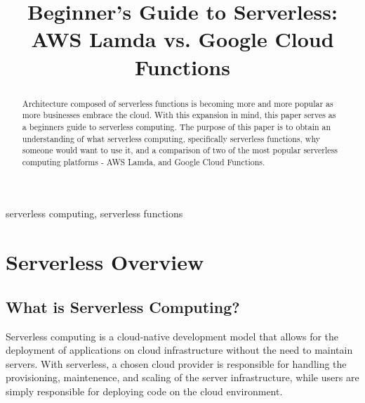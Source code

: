 \documentclass[10pt, conference]{IEEEtran}
\begin{document}
\title{Beginner's Guide to Serverless: AWS Lamda vs. Google Cloud Functions\\}

\author{
\and
{}

}

\maketitle

\begin{abstract}
Architecture composed of serverless functions is becoming more and more popular as more businesses embrace the cloud. With this expansion in mind, this paper serves as a beginners guide to serverless computing. The purpose of this paper is to obtain an understanding of what serverless computing, specifically serverless functions, why someone would want to use it, and a comparison of two of the most popular serverless computing platforms - AWS Lamda, and Google Cloud Functions. 

\end{abstract}

\begin{IEEEkeywords}
serverless computing, serverless functions
\end{IEEEkeywords}

\section{Serverless Overview}
\subsection{What is Serverless Computing?}
Serverless computing is a cloud-native development model that allows for the deployment of applications on cloud infrastructure without the need to maintain servers. With serverless, a chosen cloud provider is responsible for handling the provisioning, maintenence, and scaling of the server infrastructure, while users are simply responsible for deploying code on the cloud environment. 
\end{document}
